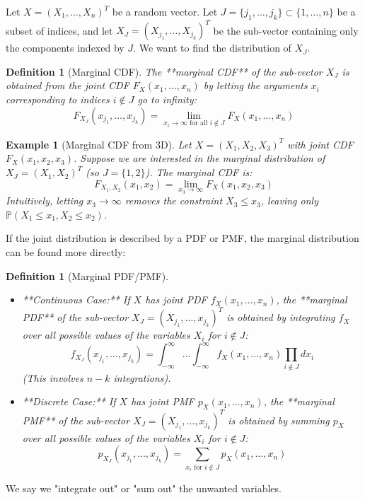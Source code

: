 \documentclass[11pt]{article}
\newtheorem{definition}[theorem]{Definition}
\newtheorem{example}[theorem]{Example}
\theoremstyle{definition} %
\renewcommand{\P}{\mathbb{P}} %
\begin{document}
Let $X = (X_1, \dots, X_n)^T$ be a random vector. Let $J = \{j_1, \dots, j_k\} \subset \{1, \dots, n\}$ be a subset of indices, and let $X_J = (X_{j_1}, \dots, X_{j_k})^T$ be the sub-vector containing only the components indexed by $J$. We want to find the distribution of $X_J$.

\begin{definition}[Marginal CDF]
The **marginal CDF** of the sub-vector $X_J$ is obtained from the joint CDF $F_X(x_1, \dots, x_n)$ by letting the arguments $x_i$ corresponding to indices $i \notin J$ go to infinity:
\[ F_{X_J}(x_{j_1}, \dots, x_{j_k}) = \lim_{x_i \to \infty \text{ for all } i \notin J} F_X(x_1, \dots, x_n) \]
\end{definition}

\begin{example}[Marginal CDF from 3D]
Let $X = (X_1, X_2, X_3)^T$ with joint CDF $F_X(x_1, x_2, x_3)$. Suppose we are interested in the marginal distribution of $X_J = (X_1, X_2)^T$ (so $J=\{1, 2\}$). The marginal CDF is:
\[ F_{X_1, X_2}(x_1, x_2) = \lim_{x_3 \to \infty} F_X(x_1, x_2, x_3) \]
Intuitively, letting $x_3 \to \infty$ removes the constraint $X_3 \le x_3$, leaving only $\P(X_1 \le x_1, X_2 \le x_2)$.
\end{example}

If the joint distribution is described by a PDF or PMF, the marginal distribution can be found more directly:

\begin{definition}[Marginal PDF/PMF] ~
    \begin{itemize}
        \item **Continuous Case:** If $X$ has joint PDF $f_X(x_1, \dots, x_n)$, the **marginal PDF** of the sub-vector $X_J = (X_{j_1}, \dots, x_{j_k})^T$ is obtained by integrating $f_X$ over all possible values of the variables $X_i$ for $i \notin J$:
        \[ f_{X_J}(x_{j_1}, \dots, x_{j_k}) = \int_{-\infty}^{\infty} \dots \int_{-\infty}^{\infty} f_X(x_1, \dots, x_n) \prod_{i \notin J} dx_i \]
        (This involves $n-k$ integrations).
        \item **Discrete Case:** If $X$ has joint PMF $p_X(x_1, \dots, x_n)$, the **marginal PMF** of the sub-vector $X_J = (X_{j_1}, \dots, x_{j_k})^T$ is obtained by summing $p_X$ over all possible values of the variables $X_i$ for $i \notin J$:
        \[ p_{X_J}(x_{j_1}, \dots, x_{j_k}) = \sum_{x_i \text{ for } i \notin J} p_X(x_1, \dots, x_n) \]
    \end{itemize}
\end{definition}
We say we "integrate out" or "sum out" the unwanted variables.
\end{document}
